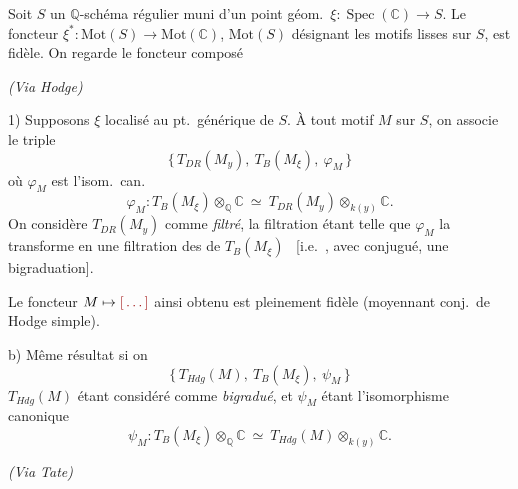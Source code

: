 \documentclass[11pt,a4paper]{article}
\begin{document}

Soit $S$ un $\mathbb{Q}$-schéma régulier  muni d'un point
géom.\ $\xi : \operatorname{Spec}(\mathbb{C}) \longrightarrow S$. Le foncteur
$\xi^{*} : \mathrm{Mot}(S) \to \mathrm{Mot}(\mathbb{C})$, $\mathrm{Mot}(S)$
désignant les motifs lisses sur $S$, est fidèle. On regarde
 le foncteur composé




\emph{(Via Hodge)}

1) Supposons $\xi$ localisé au pt.\ générique de $S$.  À tout motif $M$
sur $S$, on associe le triple
\[ \{\, T_{DR}(M_{y}),\ T_{B}(M_{\xi}),\ \varphi_{M} \,\} \]
où $\varphi_{M}$ est l'isom.\ can.
\[ \varphi_{M} : T_{B}(M_{\xi}) \otimes_{\mathbb{Q}} \mathbb{C} \ \simeq \ T_{DR}(M_{y}) \otimes_{k(y)} \mathbb{C} . \]
On considère $T_{DR}(M_{y})$ comme \emph{filtré}, la filtration étant telle que
$\varphi_{M}$ la transforme en une filtration  des
\ill{} de $T_{B}(M_{\xi})$ \ [i.e.\ \ill{}, avec \ill{} conjugué, une bigraduation].

Le foncteur $M \mapsto \ill{}$ ainsi obtenu est pleinement fidèle (moyennant
conj.\ de Hodge simple).


b) Même résultat si on  \ill{}
\[ \{\, T_{Hdg}(M),\ T_{B}(M_{\xi}),\ \psi_{M} \,\} \]
$T_{Hdg}(M)$ étant considéré comme \emph{bigradué}, et $\psi_{M}$ étant
l'isomorphisme canonique
\[ \psi_{M} : T_{B}(M_{\xi}) \otimes_{\mathbb{Q}} \mathbb{C} \ \simeq \ T_{Hdg}(M) \otimes_{k(y)} \mathbb{C} . \]



\emph{(Via Tate)}
\end{document}

